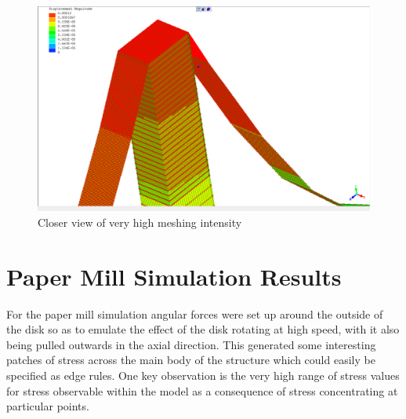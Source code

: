 \begin{figure}[H]
  \centerline{\includegraphics[width=165mm, scale=0.5]{../Graphics/BridgeCrossLoading/aboveAverageRefinement.png}}
  \caption{Closer view of very high meshing intensity}
\end{figure}



\section{Paper Mill Simulation Results}
For the paper mill simulation angular forces were set up around the outside of the disk so as to emulate the effect of the disk rotating at high speed, with it also being pulled outwards in the axial direction. This generated some interesting patches of stress across the main body of the structure which could easily be specified as edge rules. One key observation is the very high range of stress values for stress observable within the model as a consequence of stress concentrating at particular points.



